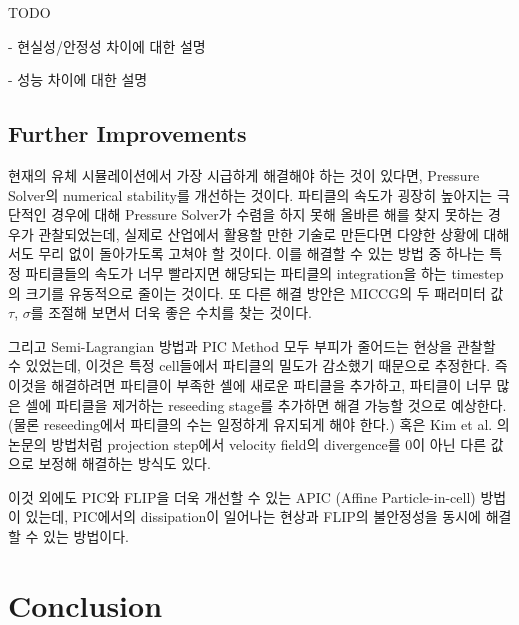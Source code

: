 \documentclass[10pt, A4]{article}
\begin{document}
TODO

- 현실성/안정성 차이에 대한 설명

- 성능 차이에 대한 설명

\subsection{Further Improvements}

현재의 유체 시뮬레이션에서 가장 시급하게 해결해야 하는 것이 있다면, Pressure Solver의 numerical stability를 개선하는 것이다. 파티클의 속도가 굉장히 높아지는 극단적인 경우에 대해 Pressure Solver가 수렴을 하지 못해 올바른 해를 찾지 못하는 경우가 관찰되었는데, 실제로 산업에서 활용할 만한 기술로 만든다면 다양한 상황에 대해서도 무리 없이 돌아가도록 고쳐야 할 것이다. 이를 해결할 수 있는 방법 중 하나는 특정 파티클들의 속도가 너무 빨라지면 해당되는 파티클의 integration을 하는 timestep의 크기를 유동적으로 줄이는 것이다. \cite[p. 35]{fluid-sim-cg} 또 다른 해결 방안은 MICCG의 두 패러미터 값 $\tau$, $\sigma$를 조절해 보면서 더욱 좋은 수치를 찾는 것이다.

그리고 Semi-Lagrangian 방법과 PIC Method 모두 부피가 줄어드는 현상을 관찰할 수 있었는데, 이것은 특정 cell들에서 파티클의 밀도가 감소했기 때문으로 추정한다. 즉 이것을 해결하려면 파티클이 부족한 셀에 새로운 파티클을 추가하고, 파티클이 너무 많은 셀에 파티클을 제거하는 reseeding stage를 추가하면 해결 가능할 것으로 예상한다. (물론 reseeding에서 파티클의 수는 일정하게 유지되게 해야 한다.) 혹은 Kim et al. \cite{volume-preservation} 의 논문의 방법처럼 projection step에서 velocity field의 divergence를 0이 아닌 다른 값으로 보정해 해결하는 방식도 있다.

이것 외에도 PIC와 FLIP을 더욱 개선할 수 있는 APIC (Affine Particle-in-cell) 방법이 있는데, PIC에서의 dissipation이 일어나는 현상과 FLIP의 불안정성을 동시에 해결할 수 있는 방법이다. \cite{apic}

\section{Conclusion}
\end{document}
